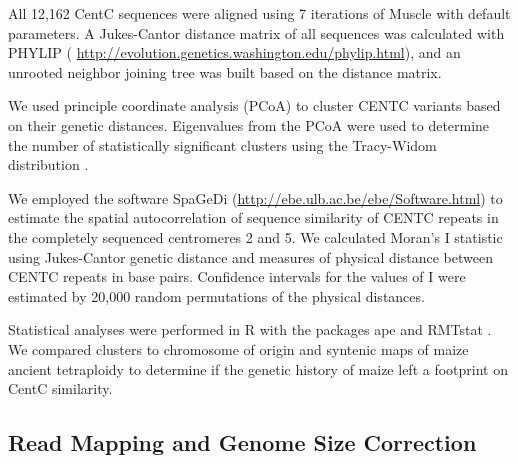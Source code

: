 All 12,162 CentC sequences were aligned using 7 iterations of Muscle \citep{Edgar2004} with default parameters.  A Jukes-Cantor distance matrix of all sequences was calculated with PHYLIP (\citep{Felsenstein1989} \url{http://evolution.genetics.washington.edu/phylip.html}), and an unrooted neighbor joining tree was built based on the distance matrix.  
	
We used principle coordinate analysis (PCoA) to cluster CENTC variants based on their genetic distances. Eigenvalues from the PCoA were used to determine the number of statistically significant clusters using the Tracy-Widom distribution \citep{Patterson2006}.  
	
We employed the software SpaGeDi (\citep{Hardy2002}\url{http://ebe.ulb.ac.be/ebe/Software.html}) to estimate the spatial autocorrelation of sequence similarity of CENTC repeats in the completely sequenced centromeres 2 and 5.  We calculated Moran’s I statistic using Jukes-Cantor genetic distance and measures of physical distance between CENTC repeats in base pairs.  Confidence intervals for the values of I were estimated by 20,000 random permutations of the physical distances.  
	
Statistical analyses were performed in R with the packages ape \citep{Paradis2004} and RMTstat \citep{Perry2009}.  We compared clusters to chromosome of origin and syntenic maps of maize ancient tetraploidy \citep{Schnable2011} to determine if the genetic history of maize left a footprint on CentC similarity.

\subsection*{Read Mapping and Genome Size Correction}
	
